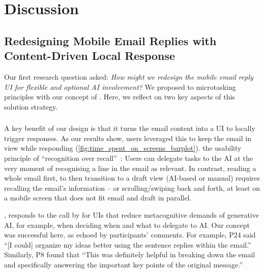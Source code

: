 \section{Discussion}

\subsection{Redesigning Mobile Email Replies with Content-Driven Local Response}
Our first research question asked: \textit{How might we redesign the mobile email reply UI for flexible and optional AI involvement?} We proposed to  microtasking  principles with our concept of \modeourstxt. Here, we reflect on two key aspects of this solution strategy. 

\subsubsection{}
A key benefit of our \modeours{} design is that it turns the email content into a UI to locally trigger responses. As our results show, users leveraged this to keep the email in view while responding (\cref{fig:time_spent_on_screens_barplot}).  the usability principle of ``recognition over recall''~\cite{Nielsen1994usabilityheuristics}: Users can  delegate tasks to the AI at the very moment of recognising a line in the email as relevant. In contrast, reading a whole email first, to then transition to a draft view (AI-based or manual) requires recalling the email's information -- or scrolling/swiping back and forth, at least on a mobile screen that does not fit email and draft in parallel. 

, \modeours{} responds to the call by \citet{Tankelevitch2024metacognitive} for UIs that reduce metacognitive demands of generative AI, for example, when deciding when and what to delegate to AI. 
Our concept was successful here, as echoed by participants' comments. For example, P24 said ``[I could] organize my ideas better using the sentence replies within the email.'' Similarly, P8 found that ``This was definitely helpful in breaking down the email and specifically answering the important key points of the original message.''

